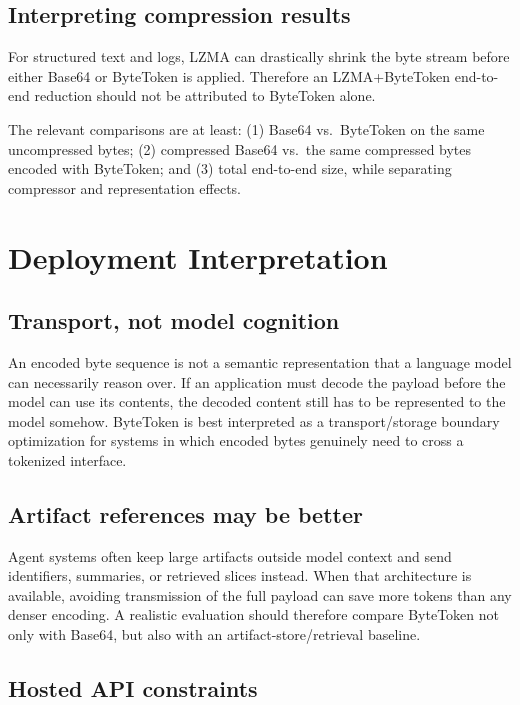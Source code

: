 \documentclass[11pt,a4paper]{article}
\begin{document}
\subsection{Interpreting compression results}

For structured text and logs, LZMA can drastically shrink the byte stream before either Base64 or ByteToken is applied. Therefore an LZMA+ByteToken end-to-end reduction should not be attributed to ByteToken alone.

The relevant comparisons are at least: (1) Base64 vs.\ ByteToken on the same uncompressed bytes; (2) compressed Base64 vs.\ the same compressed bytes encoded with ByteToken; and (3) total end-to-end size, while separating compressor and representation effects.

\section{Deployment Interpretation}

\subsection{Transport, not model cognition}

An encoded byte sequence is not a semantic representation that a language model can necessarily reason over. If an application must decode the payload before the model can use its contents, the decoded content still has to be represented to the model somehow. ByteToken is best interpreted as a transport/storage boundary optimization for systems in which encoded bytes genuinely need to cross a tokenized interface.

\subsection{Artifact references may be better}

Agent systems often keep large artifacts outside model context and send identifiers, summaries, or retrieved slices instead. When that architecture is available, avoiding transmission of the full payload can save more tokens than any denser encoding. A realistic evaluation should therefore compare ByteToken not only with Base64, but also with an artifact-store/retrieval baseline.

\subsection{Hosted API constraints}
\end{document}
